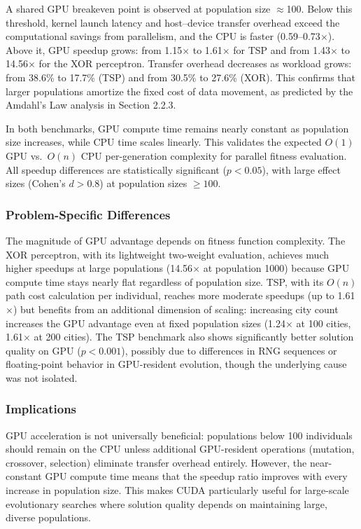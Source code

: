 A shared GPU breakeven point is observed at population size $\approx$100. Below this threshold, kernel launch latency and host--device transfer overhead exceed the computational savings from parallelism, and the CPU is faster (0.59--0.73$\times$). Above it, GPU speedup grows: from 1.15$\times$ to 1.61$\times$ for TSP and from 1.43$\times$ to 14.56$\times$ for the XOR perceptron. Transfer overhead decreases as workload grows: from 38.6\% to 17.7\% (TSP) and from 30.5\% to 27.6\% (XOR). This confirms that larger populations amortize the fixed cost of data movement, as predicted by the Amdahl's Law analysis in Section 2.2.3.

In both benchmarks, GPU compute time remains nearly constant as population size increases, while CPU time scales linearly. This validates the expected $O(1)$ GPU vs.\ $O(n)$ CPU per-generation complexity for parallel fitness evaluation. All speedup differences are statistically significant ($p < 0.05$), with large effect sizes (Cohen's $d > 0.8$) at population sizes $\geq 100$.

\subsubsection*{Problem-Specific Differences}

The magnitude of GPU advantage depends on fitness function complexity. The XOR perceptron, with its lightweight two-weight evaluation, achieves much higher speedups at large populations (14.56$\times$ at population 1000) because GPU compute time stays nearly flat regardless of population size. TSP, with its $O(n)$ path cost calculation per individual, reaches more moderate speedups (up to 1.61$\times$) but benefits from an additional dimension of scaling: increasing city count increases the GPU advantage even at fixed population sizes (1.24$\times$ at 100 cities, 1.61$\times$ at 200 cities). The TSP benchmark also shows significantly better solution quality on GPU ($p < 0.001$), possibly due to differences in RNG sequences or floating-point behavior in GPU-resident evolution, though the underlying cause was not isolated.

\subsubsection*{Implications}

GPU acceleration is not universally beneficial: populations below 100 individuals should remain on the CPU unless additional GPU-resident operations (mutation, crossover, selection) eliminate transfer overhead entirely. However, the near-constant GPU compute time means that the speedup ratio improves with every increase in population size. This makes CUDA particularly useful for large-scale evolutionary searches where solution quality depends on maintaining large, diverse populations.

